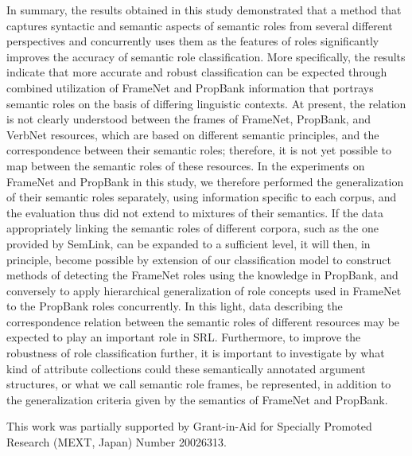 \documentclass[english]{jnlp_1.4_rep}
\begin{document}
In summary, the results obtained in this study demonstrated that a method that captures syntactic and semantic aspects of semantic roles from several different perspectives and concurrently uses them as the features of roles significantly improves the accuracy of semantic role classification. More specifically, the results indicate that more accurate and robust classification can be expected through combined utilization of FrameNet and PropBank information that portrays semantic roles on the basis of differing linguistic contexts. At present, the relation is not clearly understood between the frames of FrameNet, PropBank, and VerbNet resources, which are based on different semantic principles, and the correspondence between their semantic roles; therefore, it is not yet possible to map between the semantic roles of these resources. In the experiments on FrameNet and PropBank in this study, we therefore performed the generalization of their semantic roles separately, using information specific to each corpus, and the evaluation thus did not extend to mixtures of their semantics.
If the data appropriately linking the semantic roles of different corpora, such as the one provided by SemLink, can be expanded to a sufficient level, it will then, in principle, become possible by extension of our classification model to construct methods of detecting the FrameNet roles using the knowledge in PropBank, and conversely to apply hierarchical generalization of role concepts used in FrameNet to the PropBank roles concurrently. In this light, data describing the correspondence relation between the semantic roles of different resources may be expected to play an important role in SRL.
Furthermore, to improve the robustness of role classification further, it is important to investigate by what kind of attribute collections could these semantically annotated argument structures, or what we call semantic role frames, be represented, in addition to the generalization criteria given by the semantics of FrameNet and PropBank.



\acknowledgment

This work was partially supported by Grant-in-Aid for Specially Promoted
Research (MEXT, Japan) Number 20026313.
\end{document}
